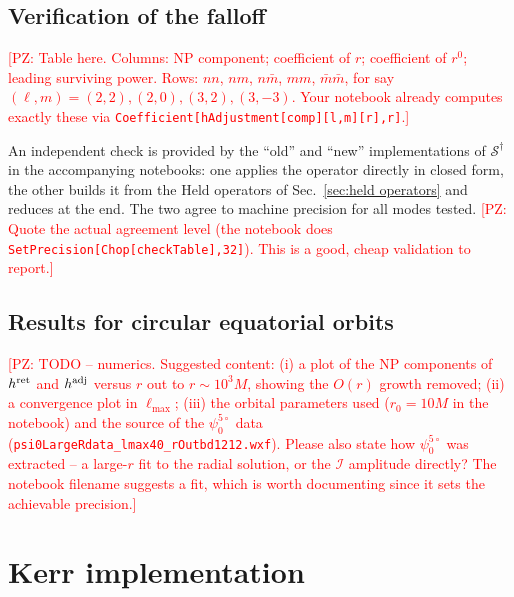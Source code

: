 \documentclass[preprint,aps,nofootinbib,a4paper,superscriptaddress,longbibliography,amsfonts, amssymb,amsmath,titlepage]{revtex4-1}
\numberwithin{equation}{section} %
\newcommand{\PZ}[1]{\textcolor{red}{\textsf{[PZ: #1]}}}
\newcommand{\emm}{m}
\def\l{\ensuremath{\ell}}
\renewcommand{\S}{{\mathcal S}}
\def\psifive{\psi^{5\circ}_{0}}
\begin{document}
\subsection{Verification of the falloff}
\label{sec:schw verification}
\PZ{Table here.  Columns: NP component; coefficient of $r$; coefficient of
$r^{0}$; leading surviving power.  Rows: $nn$, $nm$, $n\bar m$, $mm$,
$\bar m\bar m$, for say $(\l,\emm)=(2,2),(2,0),(3,2),(3,-3)$.  Your
notebook already computes exactly these via
\texttt{Coefficient[hAdjustment[comp][l,m][r],r]}.}

An independent check is provided by the ``old'' and ``new'' implementations
of $\S^{\dagger}$ in the accompanying notebooks: one applies the operator
directly in closed form, the other builds it from the Held operators of
Sec.~\ref{sec:held operators} and reduces at the end.  The two agree to
machine precision for all modes tested.
\PZ{Quote the actual agreement level (the notebook does
\texttt{SetPrecision[Chop[checkTable],32]}).  This is a good, cheap
validation to report.}

\subsection{Results for circular equatorial orbits}
\label{sec:schw results}
\PZ{TODO -- numerics.  Suggested content: (i) a plot of the NP components of
$h^{\rm ret}$ and $h^{\rm adj}$ versus $r$ out to $r\sim10^{3}M$, showing the
$O(r)$ growth removed; (ii) a convergence plot in $\l_{\max}$; (iii) the
orbital parameters used ($r_{0}=10M$ in the notebook) and the source of the
$\psifive$ data (\texttt{psi0LargeRdata\_lmax40\_rOutbd1212.wxf}).
Please also state how $\psifive$ was extracted -- a large-$r$ fit to the
radial solution, or the $\mathscr I$ amplitude directly?  The notebook
filename suggests a fit, which is worth documenting since it sets the
achievable precision.}


\section{Kerr implementation}
\label{sec:kerr}
\end{document}
